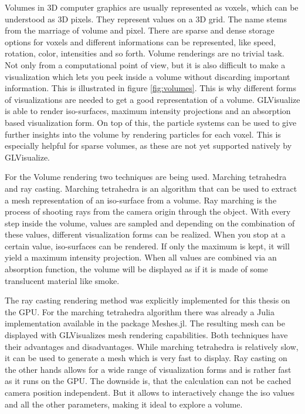 Volumes in 3D computer graphics are usually represented as voxels, which can be understood as 3D pixels. 
They represent values on a 3D grid. The name stems from the marriage of volume and pixel.
There are sparse and dense storage options for voxels and different informations can be represented, like speed, rotation, color, intensities and so forth.
Volume renderings are no trivial task. Not only from a computational point of view, but it is also difficult to make a visualization which lets you peek inside a volume without discarding important information. This is illustrated in figure \ref{fig:volumes}.
This is why different forms of visualizations are needed to get a good representation of a volume.
GLVisualize is able to render iso-surfaces, maximum intensity projections and an absorption based visualization form. 
On top of this, the particle systems can be used to give further insights into the volume by rendering particles for each voxel. This is especially helpful for sparse volumes, as these are not yet supported natively by GLVisualize.

For the Volume rendering two techniques are being used. 
Marching tetrahedra and ray casting\cite{marques2009gpu}. 
Marching tetrahedra is an algorithm that can be used to extract a mesh representation of an iso-surface from a volume.
Ray marching is the process of shooting rays from the camera origin through the object.
With every step inside the volume, values are sampled and depending on the combination of these values, different visualization forms can be realized. When you stop at a certain value, iso-surfaces can be rendered. 
If only the maximum is kept, it will yield a maximum intensity projection. 
When all values are combined via an absorption function, the volume will be displayed as if it is made of some translucent material like smoke.

The ray casting rendering method was explicitly implemented for this thesis on the GPU. For the marching tetrahedra algorithm there was already a Julia implementation available in the package Meshes.jl\cite{Tedrahedra}. The resulting mesh can be displayed with GLVisualizes mesh rendering capabilities.
Both techniques have their advantages and disadvantages. 
While marching tetrahedra is relatively slow, it can be used to generate a mesh which is very fast to display. 
Ray casting on the other hands allows for a wide range of visualization forms and is rather fast as it runs on the GPU. The downside is, that the calculation can not be cached camera position independent. But it allows to interactively change the iso values and all the other parameters, making it ideal to explore a volume.
 

